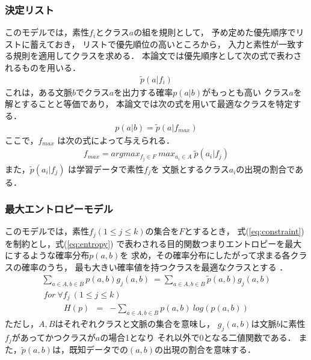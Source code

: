 \subsubsection{決定リスト}

このモデルでは，素性$f_i$とクラス$a$の組を規則として，
予め定めた優先順序でリストに蓄えておき，
リストで優先順位の高いところから，
入力と素性が一致する規則を適用してクラスを求める\cite{Yarowsky:ACL94}．
本論文では優先順序として次の式で表わされるものを用いる．
{
\begin{eqnarray}
  \label{eq:decision_list_order}
  \tilde{p}(a|f_i)
\end{eqnarray}
}
これは，ある文脈$b$でクラス$a$を出力する確率$p(a|b)$がもっとも高い
クラス$a$を解とすることと等価であり，
本論文では次の式を用いて最適なクラスを特定する．
{
\begin{eqnarray}
  \label{eq:decision_list}
  p(a|b) = \tilde{p}(a|f_{max})
\end{eqnarray}
}
ここで，$f_{max}$ は次の式によって与えられる．
{
\begin{eqnarray}
  \label{eq:decision_list2}
  f_{max} = argmax_{f_j\in F} \ max_{a_i\in A} \ \tilde{p}(a_i|f_j)
\end{eqnarray}
}
また，$\tilde{p}(a_i|f_j)$ は学習データで素性$f_j$を
文脈とするクラス$a_i$の出現の割合である．

\subsubsection{最大エントロピーモデル}

このモデルでは，素性$f_j (1\leq j\leq k)$の集合を$F$とするとき，
式(\ref{eq:constraint})を制約とし，式(\ref{eq:entropy})
で表わされる目的関数つまりエントロピーを最大にするような確率分布$p(a,b)$を
求め，その確率分布にしたがって求まる各クラスの確率のうち，
最も大きい確率値を持つクラスを最適なクラスとする
\cite{berger:cl96,ristad97,ristad98}．
{
\begin{eqnarray}
  \label{eq:constraint}
  \sum_{a\in A,b\in B}p(a,b)g_{j}(a,b) 
  \ = \sum_{a\in A,b\in B}\tilde{p}(a,b)g_{j}(a,b)\\
  \ for\ \forall f_{j}\ (1\leq j \leq k) \nonumber
\end{eqnarray}
}
{
\begin{eqnarray}
  \label{eq:entropy}
  H(p) & = & -\sum_{a\in A,b\in B}p(a,b)\ log\left(p(a,b)\right)
\end{eqnarray}
}
ただし，$A,B$はそれぞれクラスと文脈の集合を意味し，
$g_{j}(a,b)$は文脈$b$に素性$f_j$があってかつクラスが$a$の場合1となり
それ以外で0となる二値関数である．
また，$\tilde{p}(a,b)$は，既知データでの$(a,b)$の出現の割合を意味する．

